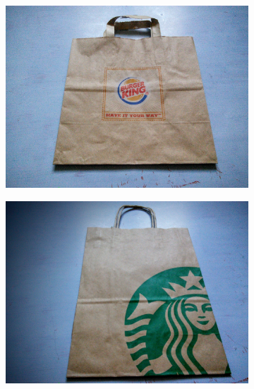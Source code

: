 \begin{figure}
    \centering
    \begin{subfigure}[t]{0.47\textwidth}
        \includegraphics[width=\textwidth]{project_graphics/collected1.jpg}
    \end{subfigure}
    \begin{subfigure}[t]{0.47\textwidth}
        \includegraphics[width=\textwidth]{project_graphics/collected2.jpg}
    \end{subfigure}
    \label{fig:CollectedMaterials1}
\end{figure}